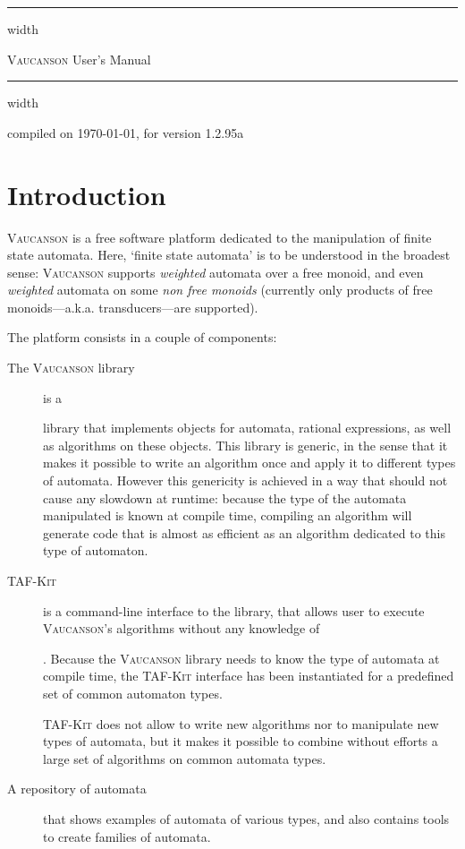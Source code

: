 \documentclass[a4paper]{report}
\makeatletter
\newcommand{\Cxx}{%
  \valign{\vfil\hbox{##}\vfil\cr
    {C\kern-.1em}\cr
    $\hbox{\fontsize\sf@size\z@\textbf{+\kern-0.05em+}}$\cr}%
    \xspace
}
\def\VcsnVersion{1.2.95a}
\newcommand{\tafkit}{\textsc{TAF-Kit}\xspace}
\newcommand{\Vauc}{\textsc{Vaucanson}\xspace}
\def\manualtitle{\Vauc User's Manual}
\makeatother
\begin{document}
\vspace*{50pt}
\vskip4pt \hrule height 4pt width \hsize \vskip4pt
\begin{center}
  \Huge \manualtitle
\end{center}
\vspace*{-1.5ex}
\vskip4pt \hrule height 4pt width \hsize \vskip4pt

\hfill compiled on \today, for version \VcsnVersion

\vfill

\setcounter{tocdepth}{2}
\makeatletter
{}
\makeatother

\vfill

\chapter*{Introduction}
\label{sec:intro}

\Vauc is a free software platform dedicated to the manipulation of
finite state automata.  Here, `finite state automata' is to be
understood in the broadest sense: \Vauc supports \emph{weighted}
automata over a free monoid, and even \emph{weighted} automata on some
\emph{non free monoids} (currently only products of free
monoids---a.k.a. transducers---are supported).

The platform consists in a couple of components:
\begin{description}
\item[The \Vauc library] is a \Cxx library that implements objects for
  automata, rational expressions, as well as algorithms on these
  objects.  This library is generic, in the sense that it makes it
  possible to write an algorithm once and apply it to different types
  of automata.  However this genericity is achieved in a way that
  should not cause any slowdown at runtime: because the type of the
  automata manipulated is known at compile time, compiling an
  algorithm will generate code that is almost as efficient as an
  algorithm dedicated to this type of automaton.

\item[\tafkit] is a command-line interface to the library, that allows
  user to execute \Vauc's algorithms without any knowledge of \Cxx.
  Because the \Vauc library needs to know the type of automata at
  compile time, the \tafkit interface has been instantiated for a
  predefined set of common automaton types.

  \tafkit does not allow to write new algorithms nor to manipulate new
  types of automata, but it makes it possible to combine without
  efforts a large set of algorithms on common automata types.

\item[A repository of automata] that shows examples of automata of
  various types, and also contains tools to create families of
  automata.
\end{description}
\end{document}
